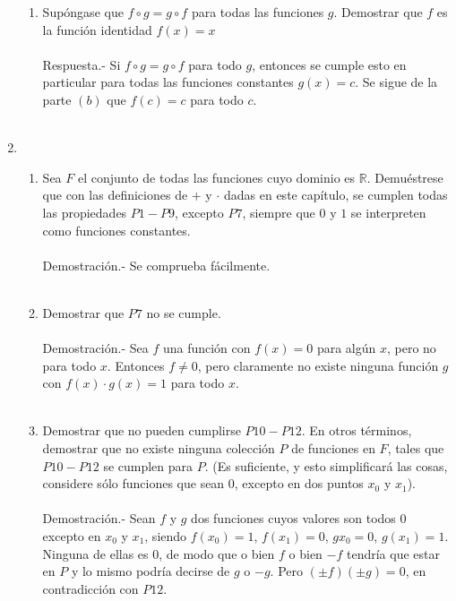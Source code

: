 \begin{enumerate}[\bfseries 1.]
\begin{enumerate}[\bfseries (a)]
		\item Supóngase que $f\circ g = g\circ f$ para todas las funciones $g$. Demostrar que $f$ es la función identidad $f(x)=x$\\\\
		    Respuesta.-\; Si $f\circ g = g  \circ f$ para todo $g$, entonces se cumple esto en particular para todas las funciones constantes $g(x)=c$. Se sigue de la parte $(b)$ que $f(c)=c$ para todo $c.$\\\\

	    \end{enumerate}

	\item
	\begin{enumerate}[\bfseries (a)]

	    \item Sea $F$ el conjunto de todas las funciones cuyo dominio es $\mathbb{R}$. Demuéstrese que con las definiciones de $+$ y $\cdot $ dadas en este capítulo, se cumplen todas las propiedades $P1-P9$, excepto $P7$, siempre que $0$ y $1$ se interpreten como funciones constantes.\\\\
	    Demostración.-\; Se comprueba fácilmente.\\\\

	    \item Demostrar que $P7$ no se cumple.\\\\
		Demostración.-\; Sea $f$ una función con $f(x)=0$ para algún $x$, pero no para todo $x$. Entonces $f\neq 0$, pero claramente no existe ninguna función $g$ con $f(x)\cdot g(x) = 1$ para todo $x$.\\\\

	    \item Demostrar que no pueden cumplirse $P10-P12.$ En otros términos, demostrar que no existe ninguna colección $P$ de funciones en $F$, tales que $P10-P12$ se cumplen para $P$. (Es suficiente, y esto simplificará las cosas, considere sólo funciones que sean $0$, excepto en dos puntos $x_0$ y $x_1$).\\\\
		Demostración.-\; Sean $f$ y $g$ dos funciones cuyos valores son todos $0$ excepto en $x_0$ y $x_1$, siendo $f(x_0)=1$, $f(x_1)=0$, $gx_0 = 0$, $g(x_1)=1.$ Ninguna de ellas es $0$, de modo que o bien $f$ o bien $-f$ tendría que estar en $P$ y lo mismo podría decirse de $g$ o $-g$. Pero $(\pm f)(\pm g) = 0$, en contradicción con $P12$.\\\\


\end{enumerate}
\end{enumerate}
